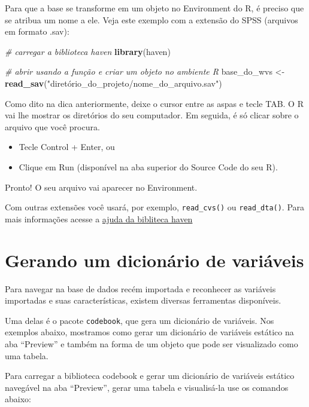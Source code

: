 \documentclass[
  10pt,
  brazil,
  a4paper,
  twoside, notitlepage, openright]{book}
\newenvironment{Shaded}{\begin{snugshade}}{\end{snugshade}}
\newcommand{\CommentTok}[1]{\textcolor[rgb]{0.56,0.35,0.01}{\textit{#1}}}
\newcommand{\KeywordTok}[1]{\textcolor[rgb]{0.13,0.29,0.53}{\textbf{#1}}}
\newcommand{\NormalTok}[1]{#1}
\newcommand{\StringTok}[1]{\textcolor[rgb]{0.31,0.60,0.02}{#1}}
\providecommand{\tightlist}{%
  \setlength{\itemsep}{0pt}\setlength{\parskip}{0pt}}
\begin{document}
Para que a base se transforme em um objeto no Environment do R, é preciso que se atribua um nome a ele. Veja este exemplo com a extensão do SPSS (arquivos em formato .sav):

\begin{Shaded}
\begin{Highlighting}[]
\CommentTok{# carregar a biblioteca haven}
\KeywordTok{library}\NormalTok{(haven)}

\CommentTok{# abrir usando a função e criar um objeto no ambiente R}
\NormalTok{base_do_wvs <-}\StringTok{ }\KeywordTok{read_sav}\NormalTok{(}\StringTok{"diretório_do_projeto/nome_do_arquivo.sav"}\NormalTok{)}
\end{Highlighting}
\end{Shaded}

Como dito na dica anteriormente, deixe o cursor entre as aspas e tecle TAB. O R vai lhe mostrar os diretórios do seu computador. Em seguida, é só clicar sobre o arquivo que você procura.

\begin{itemize}
\tightlist
\item
  Tecle Control + Enter, ou\\
\item
  Clique em Run (disponível na aba superior do Source Code do seu R).
\end{itemize}

Pronto! O seu arquivo vai aparecer no Environment.

Com outras extensões você usará, por exemplo, \texttt{read\_cvs()} ou \texttt{read\_dta()}. Para mais informações acesse a \href{https://haven.tidyverse.org/}{ajuda da bibliteca haven}

\hypertarget{gerando-um-dicionuxe1rio-de-variuxe1veis}{%
\section{Gerando um dicionário de variáveis}\label{gerando-um-dicionuxe1rio-de-variuxe1veis}}

Para navegar na base de dados recém importada e reconhecer as variáveis importadas e suas características, existem diversas ferramentas disponíveis.

Uma delas é o pacote \texttt{codebook}, que gera um dicionário de variáveis. Nos exemplos abaixo, mostramos como gerar um dicionário de variáveis estático na aba ``Preview'' e também na forma de um objeto que pode ser visualizado como uma tabela.

Para carregar a biblioteca codebook e gerar um dicionário de variáveis estático navegável na aba ``Preview'', gerar uma tabela e visualisá-la use os comandos abaixo:
\end{document}
